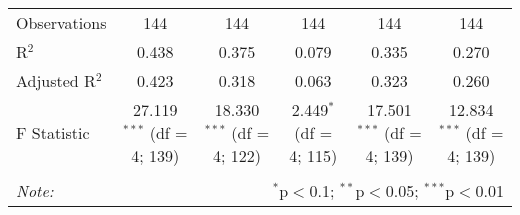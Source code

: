 \documentclass{article}
\begin{document}
\begin{table}[p!]
\begin{tabular}{@{\extracolsep{5pt}}lccccc}
Observations & 144 & 144 & 144 & 144 & 144 \\ 
R$^{2}$ & 0.438 & 0.375 & 0.079 & 0.335 & 0.270 \\ 
Adjusted R$^{2}$ & 0.423 & 0.318 & 0.063 & 0.323 & 0.260 \\ 
F Statistic & 27.119$^{***}$ (df = 4; 139) & 18.330$^{***}$ (df = 4; 122) & 2.449$^{*}$ (df = 4; 115) & 17.501$^{***}$ (df = 4; 139) & 12.834$^{***}$ (df = 4; 139) \\ 
\hline 
\hline \\[-1.8ex] 
\textit{Note:}  & \multicolumn{5}{r}{$^{*}$p$<$0.1; $^{**}$p$<$0.05; $^{***}$p$<$0.01} \\ 
\end{tabular} 
\end{table} 
\end{document}
